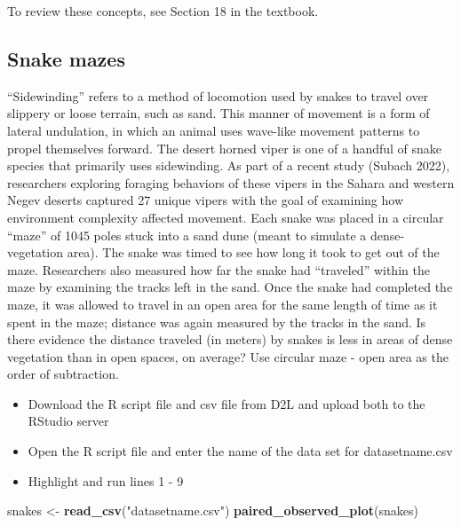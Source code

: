 \documentclass[
]{report}
\newenvironment{Shaded}{\begin{snugshade}}{\end{snugshade}}
\newcommand{\FunctionTok}[1]{\textcolor[rgb]{0.13,0.29,0.53}{\textbf{#1}}}
\newcommand{\NormalTok}[1]{#1}
\newcommand{\OtherTok}[1]{\textcolor[rgb]{0.56,0.35,0.01}{#1}}
\newcommand{\StringTok}[1]{\textcolor[rgb]{0.31,0.60,0.02}{#1}}
\begin{document}
To review these concepts, see Section 18 in the textbook.

\subsection{Snake mazes}\label{snake-mazes}

``Sidewinding'' refers to a method of locomotion used by snakes to travel over slippery or loose terrain, such as sand. This manner of movement is a form of lateral undulation, in which an animal uses wave-like movement patterns to propel themselves forward. The desert horned viper is one of a handful of snake species that primarily uses sidewinding. As part of a recent study (Subach 2022), researchers exploring foraging behaviors of these vipers in the Sahara and western Negev deserts captured 27 unique vipers with the goal of examining how environment complexity affected movement. Each snake was placed in a circular ``maze'' of 1045 poles stuck into a sand dune (meant to simulate a dense-vegetation area). The snake was timed to see how long it took to get out of the maze. Researchers also measured how far the snake had ``traveled'' within the maze by examining the tracks left in the sand. Once the snake had completed the maze, it was allowed to travel in an open area for the same length of time as it spent in the maze; distance was again measured by the tracks in the sand. Is there evidence the distance traveled (in meters) by snakes is less in areas of dense vegetation than in open spaces, on average? Use circular maze - open area as the order of subtraction.

\begin{itemize}
\item
  Download the R script file and csv file from D2L and upload both to the RStudio server
\item
  Open the R script file and enter the name of the data set for datasetname.csv
\item
  Highlight and run lines 1 - 9
\end{itemize}

\begin{Shaded}
\begin{Highlighting}[]
\NormalTok{snakes }\OtherTok{\textless{}{-}} \FunctionTok{read\_csv}\NormalTok{(}\StringTok{"datasetname.csv"}\NormalTok{)}
\FunctionTok{paired\_observed\_plot}\NormalTok{(snakes)}
\end{Highlighting}
\end{Shaded}
\end{document}
